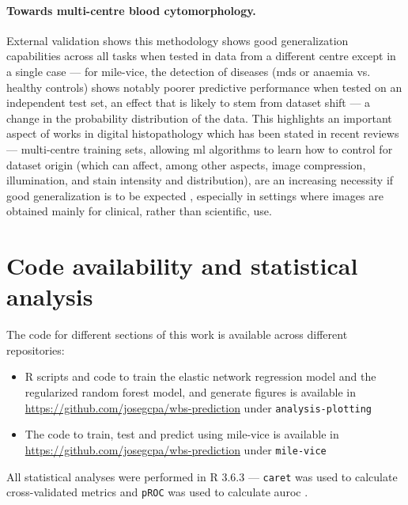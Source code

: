 \paragraph{Towards multi-centre blood cytomorphology.} External validation shows this methodology shows good generalization capabilities across all tasks when tested in data from a different centre except in a single case --- for \ac{mile-vice}, the detection of diseases (\ac{mds} or anaemia vs. healthy controls) shows notably poorer predictive performance when tested on an independent test set, an effect that is likely to stem from dataset shift --- a change in the probability distribution of the data. This highlights an important aspect of works in digital histopathology which has been stated in recent reviews --- multi-centre training sets, allowing \ac{ml} algorithms to learn how to control for dataset origin (which can affect, among other aspects, image compression, illumination, and stain intensity and distribution), are an increasing necessity if good generalization is to be expected \cite{Van_der_Laak2021-id}, especially in settings where images are obtained mainly for clinical, rather than scientific, use.

\section{Code availability and statistical analysis}

The code for different sections of this work is available across different repositories:

\begin{itemize}
    \item R scripts and code to train the elastic network regression model and the regularized random forest model, and generate figures is available in \url{https://github.com/josegcpa/wbs-prediction} under \texttt{analysis-plotting}
    \item The code to train, test and predict using \ac{mile-vice} is available in \url{https://github.com/josegcpa/wbs-prediction} under \texttt{mile-vice}
\end{itemize}

All statistical analyses were performed in R 3.6.3 \cite{R-core-team} --- \texttt{caret} was used to calculate cross-validated metrics \cite{Kuhn-2021-caret} and \texttt{pROC} was used to calculate \ac{auroc} \cite{Robin-2011-proc}. 
